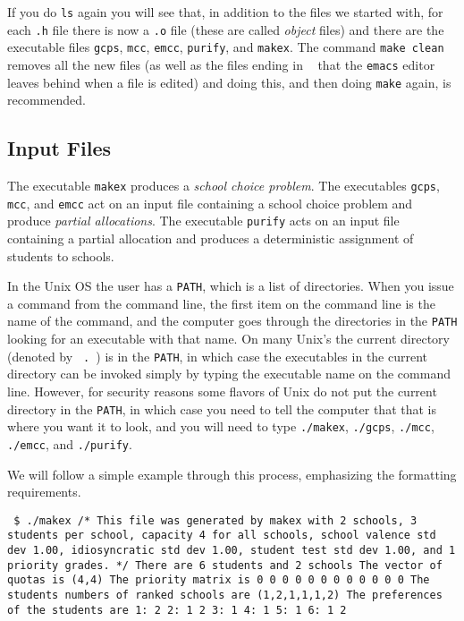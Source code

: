 \documentclass[12pt]{article}
\theoremstyle{definition}
\begin{document}
If you do \texttt{ls} again you will see that, in addition to the
files we started with, for each \texttt{.h} file there is now a
\texttt{.o} file (these are called \emph{object} files) and there are
the executable files \texttt{gcps}, \texttt{mcc}, \texttt{emcc},
\texttt{purify}, and \texttt{makex}.   The command \texttt{make clean}
removes all the new files (as well as the files ending in \texttt{~}
that the \texttt{emacs} editor leaves behind when a file is edited)
and doing this, and then doing \texttt{make} again, is recommended.

\subsection{Input Files}

The executable \texttt{makex} produces a \emph{school choice problem}.
The executables \texttt{gcps}, \texttt{mcc}, and \texttt{emcc} act on
an input file containing a school choice problem and produce
\emph{partial allocations}.  The executable \texttt{purify} acts on an
input file containing a partial allocation and produces a
deterministic assignment of students to schools.

In the Unix OS the user has a \texttt{PATH}, which is a list of
directories.  When you issue a command from the command line, the
first item on the command line is the name of the command, and the
computer goes through the directories in the \texttt{PATH} looking for
an executable with that name.  On many Unix's the current directory
(denoted by \texttt{\ .\ }) is in the \texttt{PATH}, in which case the
executables in the current directory can be invoked simply by typing
the executable name on the command line.  However, for security
reasons some flavors of Unix do not put the current directory in the
\texttt{PATH}, in which case you need to tell the computer that that
is where you want it to look, and you will need to type \texttt{./makex},
\texttt{./gcps}, \texttt{./mcc}, \texttt{./emcc}, and \texttt{./purify}.

We will follow a simple example through this process, emphasizing the formatting requirements.
\begin{obeylines}\texttt{
    \$ ./makex
/* This file was generated by makex with 2 schools,
3 students per school, capacity 4 for all schools,
school valence std dev 1.00, idiosyncratic std dev 1.00,
student test std dev 1.00, and 1 priority grades. */
There are 6 students and 2 schools
The vector of quotas is (4,4)
The priority matrix is
    0    0
    0    0
    0    0
    0    0
    0    0
    0    0
The students numbers of ranked schools are
(1,2,1,1,1,2)
The preferences of the students are
1:    2
2:    1   2
3:    1
4:    1
5:    1
6:    1   2
  }
\end{obeylines}
\end{document}
